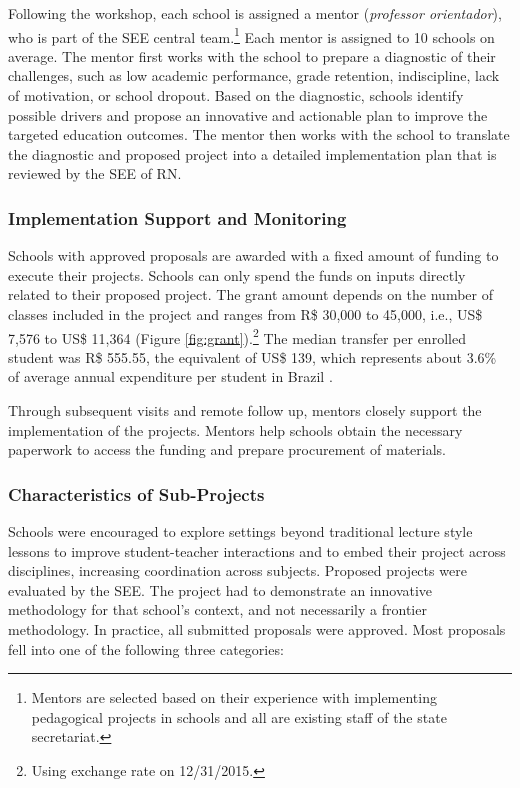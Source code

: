 \documentclass[11pt,a4paper]{article}
\begin{document}
Following the workshop, each school is assigned a mentor (\textit{professor orientador}), who is part of the SEE central team.\footnote{Mentors are selected based on their experience with implementing pedagogical projects in schools and all are existing staff of the state secretariat.} Each mentor is assigned to 10 schools on average. The mentor first works with the school to prepare a diagnostic of their challenges, such as low academic performance, grade retention, indiscipline, lack of motivation, or school dropout. Based on the diagnostic, schools identify possible drivers and propose an innovative and actionable plan to improve the targeted education outcomes. The mentor then works with the school to translate the diagnostic and proposed project into a detailed implementation plan that is reviewed by the SEE of RN. 

\subsubsection*{Implementation Support and Monitoring} \label{sec:implement}

Schools with approved proposals are awarded with a fixed amount of funding to execute their projects. Schools can only spend the funds on inputs directly related to their proposed project. The grant amount depends on the number of classes included in the project and ranges from R\$ 30,000 to 45,000, i.e., US\$ 7,576 to US\$ 11,364 (Figure \ref{fig:grant}).\footnote{Using exchange rate on 12/31/2015.} The median transfer per enrolled student was R\$ 555.55, the equivalent of US\$ 139, which represents about 3.6\% of average annual expenditure per student in Brazil \citep{eag-2016}.

Through subsequent visits and remote follow up, mentors closely support the implementation of the projects. Mentors help schools obtain the necessary paperwork to access the funding and prepare procurement of materials. 

\subsubsection*{Characteristics of Sub-Projects} \label{sec:subprojects}

Schools were encouraged to explore settings beyond traditional lecture style lessons to improve student-teacher interactions and to embed their project across disciplines, increasing coordination across subjects. Proposed projects were evaluated by the SEE. The project had to demonstrate an innovative methodology for that school's context, and not necessarily a frontier methodology. In practice, all submitted proposals were approved. Most proposals fell into one of the following three categories: 
\end{document}

